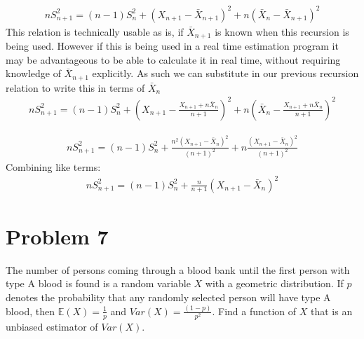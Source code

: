 \documentclass{article}
\begin{document}
\begin{align*}
n S^2_{n+1} = (n-1)S_n^2+(X_{n+1}-\bar{X}_{n+1})^2 + n(\bar{X}_n-\bar{X}_{n+1})^2
\end{align*}
This relation is technically usable as is, if $\bar{X}_{n+1}$ is known when this recursion is being used. However if this is being used in a real time estimation program it may be advantageous to be able to calculate it in real time, without requiring knowledge of $\bar{X}_{n+1}$ explicitly. As such we can substitute in our previous recursion relation to write this in terms of $\bar{X}_{n}$
\begin{align*}
n S^2_{n+1} = (n-1)S_n^2+(X_{n+1}-\frac{X_{n+1}+n \bar{X}_n}{n+1})^2 + n(\bar{X}_n-\frac{X_{n+1}+n \bar{X}_n}{n+1})^2
\end{align*}

\begin{align*}
n S^2_{n+1} = (n-1)S_n^2+\frac{n^2(X_{n+1}-\bar{X}_n)^2}{(n+1)^2} + n\frac{(X_{n+1}-\bar{X}_n)^2}{(n+1)^2}
\end{align*}
Combining like terms:
\begin{align*}
\boxed{ n S^2_{n+1} = (n-1)S_n^2+\frac{n}{n+1}(X_{n+1}-\bar{X}_n)^2} 
\end{align*}


\clearpage
\section*{Problem 7}
The number of persons coming through a blood bank until the first person with
type A blood is found is a random variable $X$ with a geometric distribution. If $p$ denotes the
probability that any randomly selected person will have type A blood, then $\mathbb{E}(X) = \tfrac{1}{p}$ and $Var(X)=\tfrac{(1-p)}{p^2}$. Find a function of $X$ that is an unbiased estimator of $Var(X)$.
\end{document}
